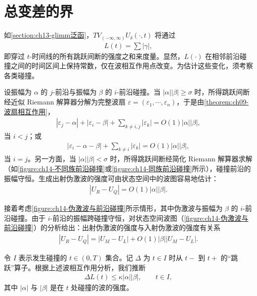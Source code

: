 \documentclass[../../main.tex]{subfiles}
\begin{document}
\section{总变差的界}\label{section:ch14-总变差的界}

如\cref{section:ch13-glimm泛函}，$TV_{(-\infty,\infty)}U_\delta(\cdot,t)$ 将通过
\begin{align}
L(t)=\sum|\gamma|,
\label{align:ch14-L}
\end{align}
即穿过 $t$-时间线的所有跳跃间断的强度之和来度量。显然，$L(\cdot)$ 在相邻前沿碰撞之间的时间区间上保持常数，仅在波相互作用点改变。为估计这些变化，须考察各类碰撞。

设振幅为 $\alpha$ 的 $j$-前沿与振幅为 $\beta$ 的 $i$-前沿碰撞。当 $|\alpha||\beta|\geqslant\sigma$ 时，所得跳跃间断经近似 Riemann 解算器分解为完整波扇 $\varepsilon=(\varepsilon_1,\cdots,\varepsilon_n)$，于是由\cref{theorem:ch09-波扇相互作用}，
\begin{align}
|\varepsilon_j-\alpha|+|\varepsilon_i-\beta|+\sum_{k\neq i,j}|\varepsilon_k|=O(1)|\alpha||\beta|,
\label{align:ch14-interaction-ij}
\end{align}
当 $i<j$；或
\begin{align}
|\varepsilon_i-\alpha-\beta|+\sum_{k\neq i}|\varepsilon_k|=O(1)|\alpha||\beta|,
\label{align:ch14-interaction-ii}
\end{align}
当 $i=j$。另一方面，当 $|\alpha||\beta|<\sigma$ 时，所得跳跃间断经简化 Riemann 解算器求解（如\cref{figure:ch14-不同族前沿碰撞}或\cref{figure:ch14-同族前沿碰撞}所示），碰撞前沿的振幅守恒。生成出射伪激波的强度可由状态空间中的波图容易地估计：
\begin{align}
|U_R-U_Q|=O(1)|\alpha||\beta|.
\label{align:ch14-pseudoshock-gen}
\end{align}

接着考虑\cref{figure:ch14-伪激波与前沿碰撞}所示情形，其中伪激波与振幅为 $\beta$ 的 $i$-前沿碰撞。由于 $i$-前沿的振幅跨碰撞守恒，对状态空间波图（\cref{figure:ch14-伪激波与前沿碰撞}）的分析给出：出射伪激波的强度与入射伪激波的强度有关系
\begin{align}
|U_R-U_Q|=|U_M-U_L|+O(1)|\beta||U_M-U_L|.
\label{align:ch14-pseudoshock-hit}
\end{align}

令 $I$ 表示发生碰撞的 $t\in(0,T)$ 集合。记 $\Delta$ 为 $t\in I$ 时从 $t-$ 到 $t+$ 的``跳跃''算子。根据上述波相互作用分析，我们推断
\begin{align}
\Delta L(t)\leqslant\kappa|\alpha||\beta|,\qquad t\in I,
\label{align:ch14-deltaL}
\end{align}
其中 $|\alpha|$ 与 $|\beta|$ 是在 $t$ 处碰撞的波的强度。
\end{document}
